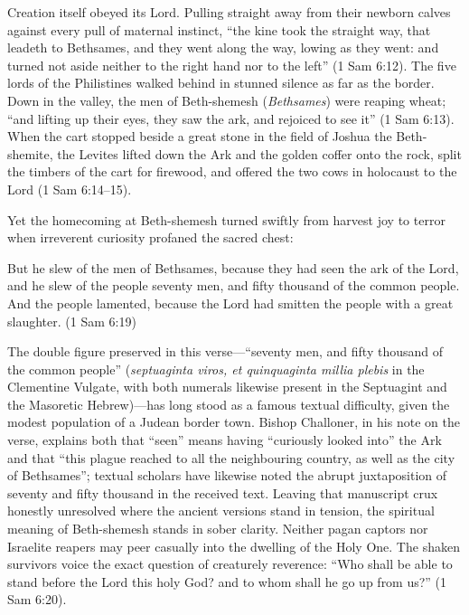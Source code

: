Creation itself obeyed its Lord. Pulling straight away from their newborn calves against every pull of maternal instinct, ``the kine took the straight way, that leadeth to Bethsames, and they went along the way, lowing as they went: and turned not aside neither to the right hand nor to the left'' (1 Sam 6:12). The five lords of the Philistines walked behind in stunned silence as far as the border. Down in the valley, the men of Beth-shemesh (\textit{Bethsames}) were reaping wheat; ``and lifting up their eyes, they saw the ark, and rejoiced to see it'' (1 Sam 6:13). When the cart stopped beside a great stone in the field of Joshua the Beth-shemite, the Levites lifted down the Ark and the golden coffer onto the rock, split the timbers of the cart for firewood, and offered the two cows in holocaust to the Lord (1 Sam 6:14--15).

Yet the homecoming at Beth-shemesh turned swiftly from harvest joy to terror when irreverent curiosity profaned the sacred chest:

\begin{scriptureblock}
But he slew of the men of Bethsames, because they had seen the ark of the Lord, and he slew of the people seventy men, and fifty thousand of the common people. And the people lamented, because the Lord had smitten the people with a great slaughter. \textnormal{(1 Sam 6:19)}
\end{scriptureblock}

The double figure preserved in this verse---``seventy men, and fifty thousand of the common people'' (\textit{septuaginta viros, et quinquaginta millia plebis} in the Clementine Vulgate, with both numerals likewise present in the Septuagint and the Masoretic Hebrew)---has long stood as a famous textual difficulty, given the modest population of a Judean border town. Bishop Challoner, in his note on the verse, explains both that ``seen'' means having ``curiously looked into'' the Ark and that ``this plague reached to all the neighbouring country, as well as the city of Bethsames''; textual scholars have likewise noted the abrupt juxtaposition of seventy and fifty thousand in the received text. Leaving that manuscript crux honestly unresolved where the ancient versions stand in tension, the spiritual meaning of Beth-shemesh stands in sober clarity. Neither pagan captors nor Israelite reapers may peer casually into the dwelling of the Holy One. The shaken survivors voice the exact question of creaturely reverence: ``Who shall be able to stand before the Lord this holy God? and to whom shall he go up from us?'' (1 Sam 6:20).

